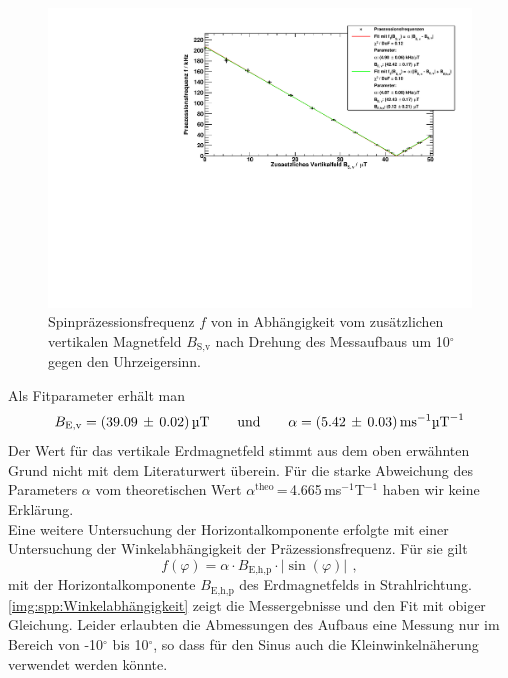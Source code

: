 \begin{figure}[H]
\begin{center}
  \includegraphics[width=\textwidth]{../img/part4/Rb85_gedreht.pdf}
  \caption{Spinpräzessionsfrequenz $f$ von  in Abhängigkeit
  vom zusätzlichen vertikalen Magnetfeld $B_\text{S,v}$
  nach Drehung des Messaufbaus um 10$^\circ$ gegen den Uhrzeigersinn.}
  \label{img:spp:SPPRb87gedr}
\end{center}
\end{figure} 

Als Fitparameter erhält man
\begin{equation}
  B_\text{E,v} = (39.09\,\pm\,0.02)\,\text{\textmu T} \qquad \text{und} \qquad \alpha = (5.42\,\pm\,0.03)\,\text{ms}^{-1} \text{\textmu T}^{-1}
\end{equation}
Der Wert für das vertikale Erdmagnetfeld stimmt aus dem oben erwähnten Grund nicht mit dem Literaturwert überein.
Für die starke Abweichung des Parameters $\alpha$ vom theoretischen Wert $\alpha^\text{theo}$\,=\,4.665\,ms$^{-1}$\textmu T$^{-1}$ haben wir keine Erklärung.\\

Eine weitere Untersuchung der Horizontalkomponente erfolgte mit einer Untersuchung der Winkelabhängigkeit
der Präzessionsfrequenz.
Für sie gilt
\begin{equation}
  f(\varphi) = \alpha \cdot B_\text{E,h,p} \cdot |\sin(\varphi)| \ \, ,  %
\end{equation}
mit der Horizontalkomponente $B_\text{E,h,p}$ des Erdmagnetfelds in Strahlrichtung.
\autoref{img:spp:Winkelabhängigkeit} zeigt die Messergebnisse und den Fit mit obiger Gleichung.
Leider erlaubten die Abmessungen des Aufbaus eine Messung nur im Bereich von -10$^\circ$ bis 10$^\circ$,
so dass für den Sinus auch die Kleinwinkelnäherung verwendet werden könnte.


